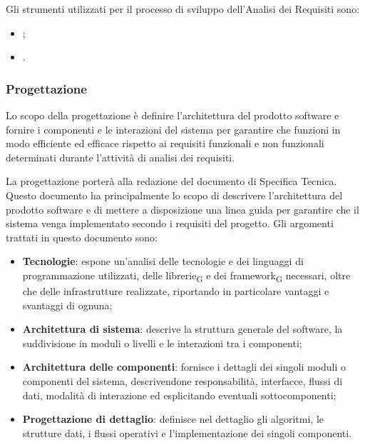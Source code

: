 Gli strumenti utilizzati per il processo di sviluppo dell'Analisi dei Requisiti sono:
\begin{itemize}
    \item {};
    \item {}.
\end{itemize}

\subsubsection{Progettazione}
Lo scopo della progettazione è definire l'architettura del prodotto software e fornire i componenti e le interazioni del sistema per garantire che funzioni in modo efficiente ed efficace rispetto ai requisiti funzionali e non funzionali determinati durante l'attività di analisi dei requisiti.

La progettazione porterà alla redazione del documento di Specifica Tecnica. Questo documento ha principalmente lo scopo di descrivere l'architettura del prodotto software e di mettere a disposizione una linea guida per garantire che il sistema venga implementato secondo i requisiti del progetto. Gli argomenti trattati in questo documento sono:
\begin{itemize}
    \item \textbf{Tecnologie}: espone un'analisi delle tecnologie e dei linguaggi di programmazione utilizzati, delle librerie\textsubscript{G} e dei framework\textsubscript{G} necessari, oltre che delle infrastrutture realizzate, riportando in particolare vantaggi e svantaggi di ognuna;
    \item \textbf{Architettura di sistema}: descrive la struttura generale del software, la suddivisione in moduli o livelli e le interazioni tra i componenti;
    \item \textbf{Architettura delle componenti}: fornisce i dettagli dei singoli moduli o componenti del sistema, descrivendone responsabilità, interfacce, flussi di dati, modalità di interazione ed esplicitando eventuali sottocomponenti;
    \item \textbf{Progettazione di dettaglio}: definisce nel dettaglio gli algoritmi, le strutture dati, i flussi operativi e l'implementazione dei singoli componenti.
\end{itemize}

